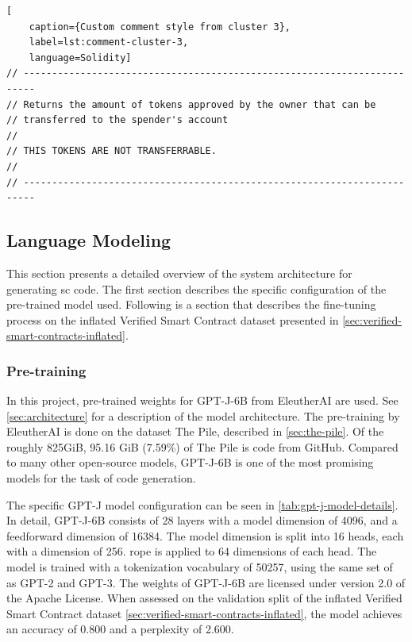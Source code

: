 \begin{lstlisting}[
    caption={Custom comment style from cluster 3},
    label=lst:comment-cluster-3,
    language=Solidity]
// ------------------------------------------------------------------------
// Returns the amount of tokens approved by the owner that can be
// transferred to the spender's account
//
// THIS TOKENS ARE NOT TRANSFERRABLE.
//
// ------------------------------------------------------------------------
\end{lstlisting}

\clearpage %

\subsection{Language Modeling}
\label{sec:rq1-language-modeling}
This section presents a detailed overview of the system architecture for generating \acrlong{sc} code. The first section describes the specific configuration of the pre-trained model used. Following is a section that describes the fine-tuning process on the inflated Verified Smart Contract dataset presented in \cref{sec:verified-smart-contracts-inflated}.

\subsubsection{Pre-training}
\label{sec:pretraining}
In this project, pre-trained weights for GPT-J-6B from EleutherAI are used. See \cref{sec:architecture} for a description of the model  architecture. The pre-training by EleutherAI is done on the dataset The Pile, described in \cref{sec:the-pile}. Of the roughly 825GiB, 95.16 GiB (7.59\%) of The Pile is code from GitHub. Compared to many other open-source models, GPT-J-6B is one of the most promising models for the task of code generation.

The specific GPT-J model configuration can be seen in \cref{tab:gpt-j-model-details}. In detail, GPT-J-6B consists of 28 layers with a model dimension of 4096, and a feedforward dimension of 16384. The model dimension is split into 16 heads, each with a dimension of 256. \acrfull{rope} is applied to 64 dimensions of each head. The model is trained with a tokenization vocabulary of 50257, using the same set of  as GPT-2 and GPT-3. The weights of GPT-J-6B are licensed under version 2.0 of the Apache License. When assessed on the validation split of the inflated Verified Smart Contract dataset \cref{sec:verified-smart-contracts-inflated}, the model achieves an accuracy of 0.800 and a perplexity of 2.600.

